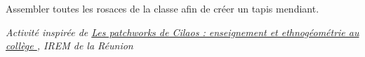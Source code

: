 \begin{enigme}
      Assembler toutes les rosaces de la classe afin de créer un tapis mendiant.
\end{enigme} 

\vfill\hfill{\it\small Activité inspirée de \href{https://irem.univ-reunion.fr/spip.php?article786}{\og Les patchworks de Cilaos : enseignement et ethnogéométrie au collège \fg}, IREM de la Réunion}
